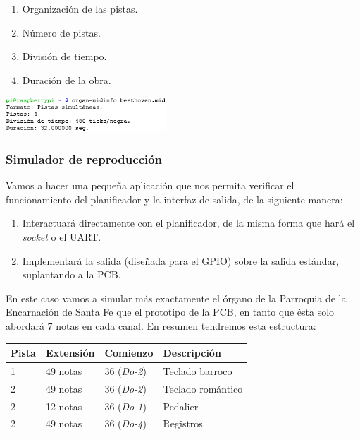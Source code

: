 \documentclass[10pt,a4paper]{article}
\begin{document}
	\begin{multicols}{2}
		\begin{enumerate}
			\item Organización de las pistas.
			\item Número de pistas.
			\item División de tiempo.
			\item Duración de la obra.
		\end{enumerate}
		\columnbreak
		\begin{center}
			\includegraphics[width=0.45\textwidth]{images/cap_midinfo} 
		\end{center}
	\end{multicols}
		
	\subsubsection*{Simulador de reproducción}
	
	Vamos a hacer una pequeña aplicación que nos permita verificar el funcionamiento del planificador y la interfaz de salida, de la siguiente manera:
	
	\begin{enumerate}
		\item Interactuará directamente con el planificador, de la misma forma que hará el \textit{socket} o el UART.
		\item Implementará la salida (diseñada para el GPIO) sobre la salida estándar, suplantando a la PCB.
	\end{enumerate}
	
	En este caso vamos a simular más exactamente el órgano de la Parroquia de la Encarnación de Santa Fe que el prototipo de la PCB, en tanto que ésta solo abordará 7 notas en cada canal. En resumen tendremos esta estructura:
	
	\begin{center}
		\begin{tabular}{|l|l|l|l|}
			\hline \textbf{Pista} & \textbf{Extensión} & \textbf{Comienzo} & \textbf{Descripción} \\ 
			\hline 1 & 49 notas & 36 (\textit{Do-2}) & Teclado barroco \\
			\hline 2 & 49 notas & 36 (\textit{Do-2}) & Teclado romántico \\
			\hline 2 & 12 notas & 36 (\textit{Do-1}) & Pedalier \\
			\hline 2 & 49 notas & 36 (\textit{Do-4}) & Registros \\
			\hline 
		\end{tabular}
	\end{center}
	
\end{document}
